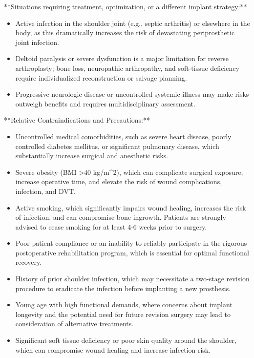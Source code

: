 **Situations requiring treatment, optimization, or a different implant strategy:**
\begin{itemize}
  \item Active infection in the shoulder joint (e.g., septic arthritis) or elsewhere in the body, as this dramatically increases the risk of devastating periprosthetic joint infection.
  \item Deltoid paralysis or severe dysfunction is a major limitation for reverse arthroplasty; bone loss, neuropathic arthropathy, and soft-tissue deficiency require individualized reconstruction or salvage planning.
  \item Progressive neurologic disease or uncontrolled systemic illness may make risks outweigh benefits and requires multidisciplinary assessment.
\end{itemize}

**Relative Contraindications and Precautions:**
\begin{itemize}
  \item Uncontrolled medical comorbidities, such as severe heart disease, poorly controlled diabetes mellitus, or significant pulmonary disease, which substantially increase surgical and anesthetic risks.
  \item Severe obesity (BMI >40 kg/m\textasciicircum2), which can complicate surgical exposure, increase operative time, and elevate the risk of wound complications, infection, and DVT.
  \item Active smoking, which significantly impairs wound healing, increases the risk of infection, and can compromise bone ingrowth. Patients are strongly advised to cease smoking for at least 4-6 weeks prior to surgery.
  \item Poor patient compliance or an inability to reliably participate in the rigorous postoperative rehabilitation program, which is essential for optimal functional recovery.
  \item History of prior shoulder infection, which may necessitate a two-stage revision procedure to eradicate the infection before implanting a new prosthesis.
  \item Young age with high functional demands, where concerns about implant longevity and the potential need for future revision surgery may lead to consideration of alternative treatments.
  \item Significant soft tissue deficiency or poor skin quality around the shoulder, which can compromise wound healing and increase infection risk.
\end{itemize}

